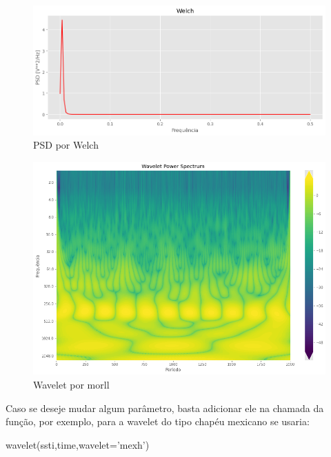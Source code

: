 \documentclass[12pt,a4paper,portuguese]{article}
\begin{document}
\begin{figure}[H]
	\centering
	\includegraphics[width=1\linewidth]{lista6-1}
	\caption{PSD por Welch}
	\label{fig:lista6-1}
\end{figure}

\begin{figure}[H]
	\centering
	\includegraphics[width=1\linewidth]{lista6-2}
	\caption{Wavelet por morll}
	\label{fig:lista6-2}
\end{figure}

Caso se deseje mudar algum parâmetro, basta adicionar ele na chamada da função, por exemplo, para a wavelet do tipo chapéu mexicano se usaria:
\begin{python}
wavelet(ssti,time,wavelet='mexh')
\end{python}
\end{document}
